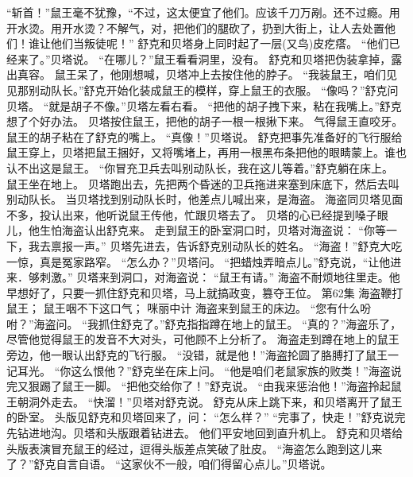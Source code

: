 \documentclass[a4paper,12pt,UTF8,twoside]{ctexbook}
\begin{document}
        “斩首！”鼠王毫不犹豫，“不过，这太便宜了他们。应该千刀万剐。还不过瘾。用开水烫。用开水烫？不解气，对，把他们的腿砍了，扔到大街上，让人去处置他们！谁让他们当叛徒呢！” 
        舒克和贝塔身上同时起了一层(又鸟)皮疙瘩。 
        “他们已经来了。”贝塔说。 
        “在哪儿？”鼠王看看洞里，没有。 
        舒克和贝塔把伪装拿掉，露出真容。 
        鼠王呆了，他刚想喊，贝塔冲上去按住他的脖子。 
        “我装鼠王，咱们见见那别动队长。”舒克开始化装成鼠王的模样，穿上鼠王的衣服。 
        “像吗？”舒克问贝塔。 
        “就是胡子不像。”贝塔左看右看。 
        “把他的胡子拽下来，粘在我嘴上。”舒克想了个好办法。 
        贝塔按住鼠王，把他的胡子一根一根揪下来。 
        气得鼠王直咬牙。 
        鼠王的胡子粘在了舒克的嘴上。 
        “真像！”贝塔说。 
        舒克把事先准备好的飞行服给鼠王穿上，贝塔把鼠王捆好，又将嘴堵上，再用一根黑布条把他的眼睛蒙上。谁也认不出这是鼠王。 
        “你冒充卫兵去叫别动队长，我在这儿等着。”舒克躺在床上。 
        鼠王坐在地上。 
        贝塔跑出去，先把两个昏迷的卫兵拖进来塞到床底下，然后去叫别动队长。 
        当贝塔找到别动队长时，他差点儿喊出来，是海盗。 
        海盗同贝塔见面不多，投认出来，他听说鼠王传他，忙跟贝塔去了。 
        贝塔的心已经提到嗓子眼儿，他生怕海盗认出舒克来。 
        走到鼠王的卧室洞口时，贝塔对海盗说： 
        “你等一下，我去禀报一声。” 
        贝塔先进去，告诉舒克别动队长的姓名。 
        “海盗！”舒克大吃一惊，真是冤家路窄。 
        “怎么办？”贝塔问。 
        “把蜡烛弄暗点儿。”舒克说，“让他进来．够刺激。” 
        贝塔来到洞口，对海盗说： 
        “鼠王有请。” 
        海盗不耐烦地往里走。他早想好了，只要一抓住舒克和贝塔，马上就搞政变，篡夺王位。   第62集 
        海盗鞭打鼠王； 
        鼠王咽不下这口气； 
        咪丽中计   
        海盗来到鼠王的床边。 
        “您有什么吩咐？”海盗问。 
        “我抓住舒克了。”舒克指指蹲在地上的鼠王。 
        “真的？”海盗乐了，尽管他觉得鼠王的发音不大对头，可他顾不上分析了。 
        海盗走到蹲在地上的鼠王旁边，他一眼认出舒克的飞行服。 
        “没错，就是他！”海盗抡圆了胳膊打了鼠王一记耳光。 
        “你这么恨他？”舒克坐在床上问。 
        “他是咱们老鼠家族的败类！”海盗说完又狠踢了鼠王一脚。 
        “把他交给你了！”舒克说。 
        “由我来惩治他！”海盗拎起鼠王朝洞外走去。 
        “快溜！”贝塔对舒克说。 
        舒克从床上跳下来，和贝塔离开了鼠王的卧室。 
        头版见舒克和贝塔回来了，问： 
        “怎么样？” 
        “完事了，快走！”舒克说完先钻进地沟。贝塔和头版跟着钻进去。 
        他们平安地回到直升机上。 
        舒克和贝塔给头版表演冒充鼠王的经过，逗得头版差点笑破了肚皮。 
        “海盗怎么跑到这儿来了？”舒克自言自语。 
        “这家伙不一般，咱们得留心点儿。”贝塔说。 
\end{document}
